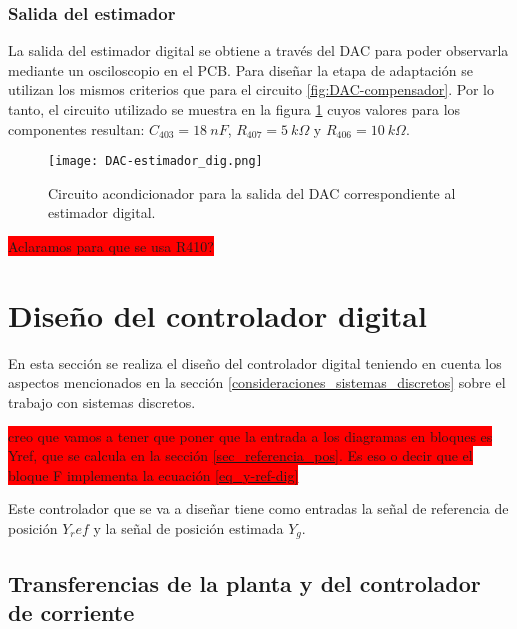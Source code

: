 \subsubsection{Salida del estimador}

La salida del estimador digital se obtiene a través del DAC para poder observarla mediante un osciloscopio en el PCB. Para diseñar la etapa de adaptación se utilizan los mismos criterios que para el circuito \ref{fig:DAC-compensador}. Por lo tanto, el circuito utilizado se muestra en la figura \ref{fig:DAC-estimador} cuyos valores para los componentes resultan: $C_{403}=18\:nF$, $R_{407}=5\:k\Omega$ y $R_{406}=10\:k\Omega$.

\begin{figure}[H]
	\centering
	\texttt{[image: DAC-estimador\_dig.png]}
	\caption{Circuito acondicionador para la salida del DAC correspondiente al estimador digital.}
	\label{fig:DAC-estimador}
\end{figure}

\colorbox{red}{Aclaramos para que se usa R410?}

\section{Diseño del controlador digital}

En esta sección se realiza el diseño del controlador digital teniendo en cuenta los aspectos mencionados en la sección  \ref{consideraciones_sistemas_discretos} sobre el trabajo con sistemas discretos.

\colorbox{red}{creo que vamos a tener que poner que la entrada a los diagramas en bloques es Yref, que se calcula en la sección \ref{sec_referencia_pos}. Es eso o decir que el bloque F implementa la ecuación \ref{eq_y-ref-dig}}

Este controlador que se va a diseñar tiene como entradas la señal de referencia de posición $Y_ref$ y la señal de posición estimada $Y_g$.



\subsection{Transferencias de la planta y del controlador de corriente}

